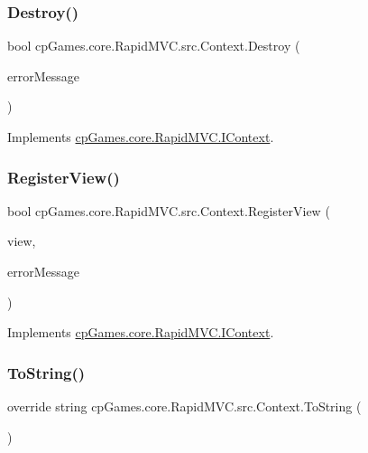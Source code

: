 \subsubsection{\texorpdfstring{Destroy()}{Destroy()}}
{\footnotesize\ttfamily bool cp\+Games.\+core.\+Rapid\+M\+V\+C.\+src.\+Context.\+Destroy (\begin{DoxyParamCaption}\item[{out string}]{error\+Message }\end{DoxyParamCaption})}



Implements \mbox{\hyperlink{interfacecp_games_1_1core_1_1_rapid_m_v_c_1_1_i_context_acf8d52b810d6b088bf1999ea980c7705}{cp\+Games.\+core.\+Rapid\+M\+V\+C.\+I\+Context}}.

\mbox{\label{classcp_games_1_1core_1_1_rapid_m_v_c_1_1src_1_1_context_a382256a6867b84c58d9c69b995423e63}} 
\subsubsection{\texorpdfstring{RegisterView()}{RegisterView()}}
{\footnotesize\ttfamily bool cp\+Games.\+core.\+Rapid\+M\+V\+C.\+src.\+Context.\+Register\+View (\begin{DoxyParamCaption}\item[{\mbox{\hyperlink{interfacecp_games_1_1core_1_1_rapid_m_v_c_1_1_i_view}{I\+View}}}]{view,  }\item[{out string}]{error\+Message }\end{DoxyParamCaption})}



Implements \mbox{\hyperlink{interfacecp_games_1_1core_1_1_rapid_m_v_c_1_1_i_context_a975a12d7037f6425755b27feeeafb155}{cp\+Games.\+core.\+Rapid\+M\+V\+C.\+I\+Context}}.

\mbox{\label{classcp_games_1_1core_1_1_rapid_m_v_c_1_1src_1_1_context_a37d5c3af5fec76fb0eb38e925988f8fe}} 
\subsubsection{\texorpdfstring{ToString()}{ToString()}}
{\footnotesize\ttfamily override string cp\+Games.\+core.\+Rapid\+M\+V\+C.\+src.\+Context.\+To\+String (\begin{DoxyParamCaption}{ }\end{DoxyParamCaption})}


